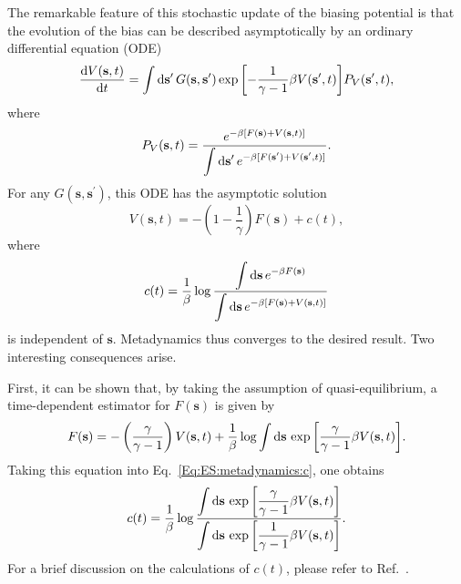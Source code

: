 The remarkable feature of this stochastic update of the biasing potential is that the evolution of the bias can be described asymptotically by an ordinary differential equation (ODE)\cite{DamaPRL2014,TiwaryJCP2015}
\begin{equation}
    \frac{\mathop{}\!\mathrm{d} V(\mathbf{s},t)}{\mathop{}\!\mathrm{d} t}=\int \mathop{}\!\mathrm{d} \mathbf{s}^\prime\, G(\mathbf{s},\mathbf{s}^\prime)\exp{\left[-\frac{1}{\gamma-1}\beta V(\mathbf{s}^\prime,t)\right]}P_V(\mathbf{s}^\prime,t),
\end{equation}
where
\begin{equation}
    P_V(\mathbf{s},t)=\frac{e^{-\beta[F(\mathbf{s})+V(\mathbf{s},t)]}}{\displaystyle\int \mathop{}\!\mathrm{d} \mathbf{s}^\prime\, e^{-\beta[F(\mathbf{s}^\prime)+V(\mathbf{s}^\prime,t)]}}.
\end{equation}
For any $G(\mathbf{s},\mathbf{s}^\prime)$, this ODE has the asymptotic solution
\begin{equation}
    V(\mathbf{s},t)=-\left(1-\frac{1}{\gamma}\right)F(\mathbf{s})+c(t),
\end{equation}
where
\begin{equation}
    c(t)=\frac{1}{\beta}\log{\frac{\displaystyle\int \mathop{}\!\mathrm{d}\mathbf{s}\, e^{-\beta F(\mathbf{s})}}{\displaystyle\int \mathop{}\!\mathrm{d}\mathbf{s}\, e^{-\beta \left[F(\mathbf{s})+V(\mathbf{s},t)\right]}}}
    \label{Eq:ES:metadynamics:c}
\end{equation}
is independent of $\mathbf{s}$. Metadynamics thus converges to the desired result. Two interesting consequences arise.

First, it can be shown that, by taking the assumption of quasi-equilibrium, a time-dependent estimator for $F(\mathbf{s})$ is given by\cite{TiwaryJPCB2015}
\begin{equation}
    F(\mathbf{s})=-\left(\frac{\gamma}{\gamma -1}\right)V(\mathbf{s},t)+\frac{1}{\beta}\log{\int \mathop{}\!\mathrm{d}\mathbf{s}\, \exp{\left[\frac{\gamma}{\gamma-1}\beta V(\mathbf{s},t)\right]}}.
    \label{eq:ES:metadynamics:FsFromBiasedPotential}
\end{equation}
Taking this equation into Eq.~\ref{Eq:ES:metadynamics:c}, one obtains
\begin{equation}
    c(t)=\frac{1}{\beta}\log{\frac{\displaystyle\int \mathop{}\!\mathrm{d}\mathbf{s}\,\exp{\left[\frac{\gamma}{\gamma-1}\beta V(\mathbf{s},t)\right]}}{\displaystyle\int \mathop{}\!\mathrm{d}\mathbf{s}\,\exp{\left[\frac{1}{\gamma-1}\beta V(\mathbf{s},t)\right]}}}.
\end{equation}
For a brief discussion on the calculations of $c(t)$, please refer to Ref.~\cite{GibertiJCTC2020}.

